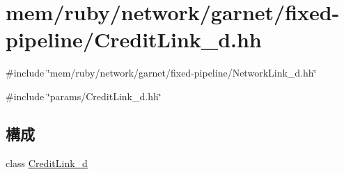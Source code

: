 \hypertarget{CreditLink__d_8hh}{
\section{mem/ruby/network/garnet/fixed-\/pipeline/CreditLink\_\-d.hh}
\label{CreditLink__d_8hh}
}
{\ttfamily \#include \char`\"{}mem/ruby/network/garnet/fixed-\/pipeline/NetworkLink\_\-d.hh\char`\"{}}\par
{\ttfamily \#include \char`\"{}params/CreditLink\_\-d.hh\char`\"{}}\par
\subsection*{構成}
\begin{DoxyCompactItemize}
\item 
class \hyperlink{classCreditLink__d}{CreditLink\_\-d}
\end{DoxyCompactItemize}

